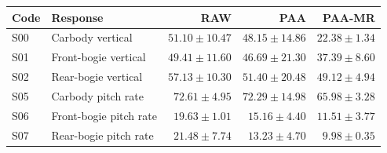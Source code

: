 \begin{tabular}{llrrr}
\toprule
Code & Response & RAW & PAA & PAA-MR \\
\midrule
S00 & Carbody vertical & $51.10 \pm 10.47$ & $48.15 \pm 14.86$ & $22.38 \pm 1.34$ \\
S01 & Front-bogie vertical & $49.41 \pm 11.60$ & $46.69 \pm 21.30$ & $37.39 \pm 8.60$ \\
S02 & Rear-bogie vertical & $57.13 \pm 10.30$ & $51.40 \pm 20.48$ & $49.12 \pm 4.94$ \\
S05 & Carbody pitch rate & $72.61 \pm 4.95$ & $72.29 \pm 14.98$ & $65.98 \pm 3.28$ \\
S06 & Front-bogie pitch rate & $19.63 \pm 1.01$ & $15.16 \pm 4.40$ & $11.51 \pm 3.77$ \\
S07 & Rear-bogie pitch rate & $21.48 \pm 7.74$ & $13.23 \pm 4.70$ & $9.98 \pm 0.35$ \\
\bottomrule
\end{tabular}
